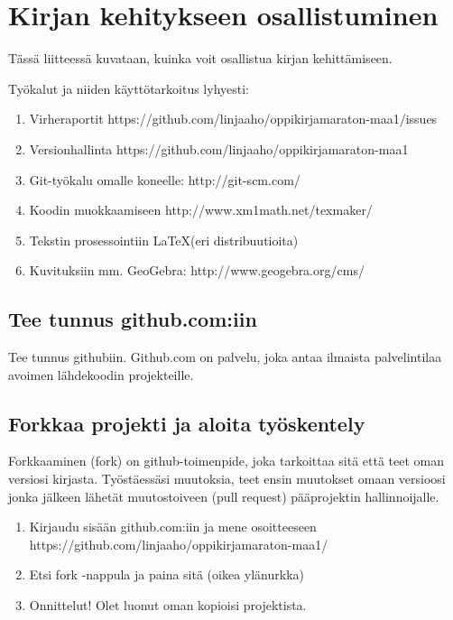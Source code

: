 \chapter{Kirjan kehitykseen osallistuminen}

Tässä liitteessä kuvataan, kuinka voit osallistua kirjan kehittämiseen.

Työkalut ja niiden käyttötarkoitus lyhyesti:

\begin{enumerate}

\item Virheraportit https://github.com/linjaaho/oppikirjamaraton-maa1/issues
\item Versionhallinta https://github.com/linjaaho/oppikirjamaraton-maa1
\item Git-työkalu omalle koneelle: http://git-scm.com/
\item Koodin muokkaamiseen http://www.xm1math.net/texmaker/
\item Tekstin prosessointiin \LaTeX (eri distribuutioita)
\item Kuvituksiin mm. GeoGebra: http://www.geogebra.org/cms/

\end{enumerate}

\section{Tee tunnus github.com:iin}

Tee tunnus githubiin. Github.com on palvelu, joka antaa ilmaista palvelintilaa avoimen lähdekoodin projekteille.


\section{Forkkaa projekti ja aloita työskentely}

Forkkaaminen (fork) on github-toimenpide, joka tarkoittaa sitä että teet oman versiosi kirjasta. Työstäessäsi muutoksia, teet ensin muutokset omaan versioosi jonka jälkeen lähetät muutostoiveen (pull request) pääprojektin hallinnoijalle.

\begin{enumerate}

\item Kirjaudu sisään github.com:iin ja mene osoitteeseen https://github.com/linjaaho/oppikirjamaraton-maa1/
\item Etsi fork -nappula ja paina sitä (oikea ylänurkka)
\item Onnittelut! Olet luonut oman kopioisi projektista. 

\end{enumerate}

